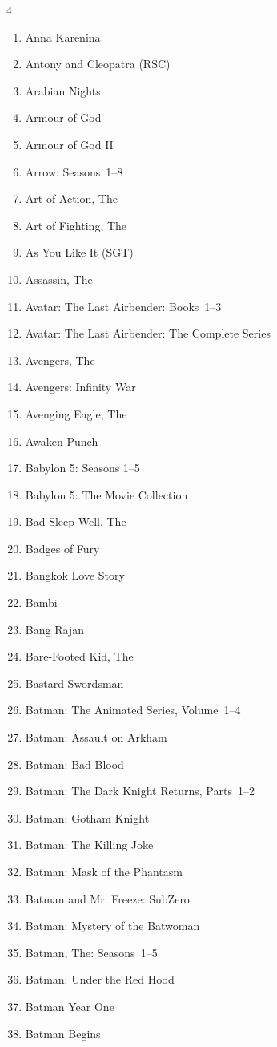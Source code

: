 \documentclass{article}
\begin{document}
\begin{multicols}{4}
\begin{enumerate}
\item Anna Karenina
\item Antony and Cleopatra (RSC)
\item Arabian Nights
\item Armour of God
\item Armour of God II
\item Arrow: Seasons~1--8
\item Art of Action, The
\item Art of Fighting, The
\item As You Like It (SGT)
\item Assassin, The
\item Avatar: The Last Airbender: Books~1--3
\item Avatar: The Last Airbender: The Complete Series
\item Avengers, The
\item Avengers: Infinity War
\item Avenging Eagle, The
\item Awaken Punch
\item Babylon 5: Seasons 1--5
\item Babylon 5: The Movie Collection
\item Bad Sleep Well, The
\item Badges of Fury
\item Bangkok Love Story
\item Bambi
\item Bang Rajan
\item Bare-Footed Kid, The
\item Bastard Swordsman
\item Batman: The Animated Series, Volume~1--4
\item Batman: Assault on Arkham
\item Batman: Bad Blood
\item Batman: The Dark Knight Returns, Parts~1--2
\item Batman: Gotham Knight
\item Batman: The Killing Joke
\item Batman: Mask of the Phantasm
\item Batman and Mr. Freeze: SubZero
\item Batman: Mystery of the Batwoman
\item Batman, The: Seasons~1--5
\item Batman: Under the Red Hood
\item Batman Year One
\item Batman Begins

\end{enumerate}
\end{multicols}
\end{document}
